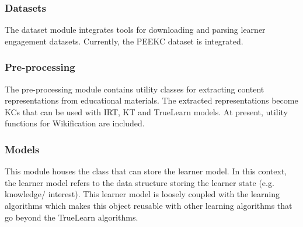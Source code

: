 \documentclass[letterpaper]{article} %
\begin{document}



\subsubsection{Datasets}
The dataset module integrates tools for downloading and parsing learner engagement datasets. Currently, the PEEKC dataset is integrated. 

\subsubsection{Pre-processing}
The pre-processing module contains utility classes for extracting content representations from educational materials. The extracted representations become KCs that can be used with IRT, KT and TrueLearn models. At present, utility functions for Wikification are included. 

\subsubsection{Models}
This module houses the class that can store the learner model. In this context, the learner model refers to the data structure storing the learner state (e.g. knowledge/ interest). This learner model is loosely coupled with the learning algorithms which makes this object reusable with other learning algorithms that go beyond the TrueLearn algorithms.
\end{document}
